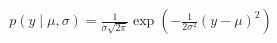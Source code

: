 \documentclass[preview]{standalone}
\begin{document}
\begin{align*}
p(y \mid \mu, \sigma)=\frac{1}{\sigma \sqrt{2 \pi}} \exp (-\frac{1}{2 \sigma^2}(y-\mu)^2)
\end{align*}
\end{document}

